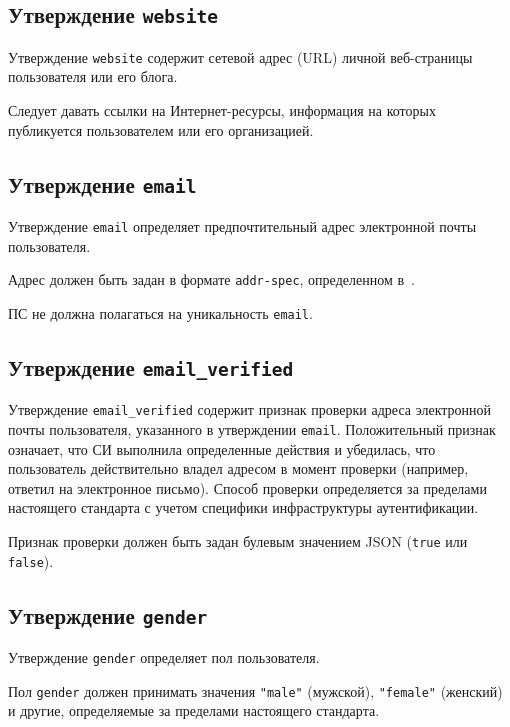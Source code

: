 \subsection{Утверждение \lstinline{website}}\label{CLAIMS.Website}

Утверждение \lstinline{website} содержит сетевой адрес (URL) личной 
веб-страницы пользователя или его блога.

Следует давать ссылки на Интернет-ресурсы, информация на которых публикуется 
пользователем или его организацией.

\subsection{Утверждение \lstinline{email}}\label{CLAIMS.Email}

Утверждение \lstinline{email} определяет предпочтительный адрес электронной 
почты пользователя.

Адрес должен быть задан в формате \lstinline{addr-spec}, определенном 
в~\cite{RFC5322}.

ПС не должна полагаться на уникальность \lstinline{email}.

\subsection{Утверждение \lstinline{email_verified}}\label{CLAIMS.EmailVerified}

Утверждение \lstinline{email_verified} содержит признак проверки адреса
электронной почты пользователя, указанного в утверждении \lstinline{email}.
%
Положительный признак означает, что СИ выполнила определенные действия и
убедилась, что пользователь действительно владел адресом в момент проверки
(например, ответил на электронное письмо).
%
Способ проверки определяется за пределами настоящего стандарта с учетом 
специфики инфраструктуры аутентификации.  

Признак проверки должен быть задан булевым значением JSON
(\lstinline{true} или \lstinline{false}).

\subsection{Утверждение \lstinline{gender}}\label{CLAIMS.Gender}

Утверждение \lstinline{gender} определяет пол пользователя. 

Пол \lstinline{gender} должен принимать значения 
\lstinline{"male"} (мужской), \lstinline{"female"} (женский)
и другие, определяемые за пределами настоящего стандарта.

